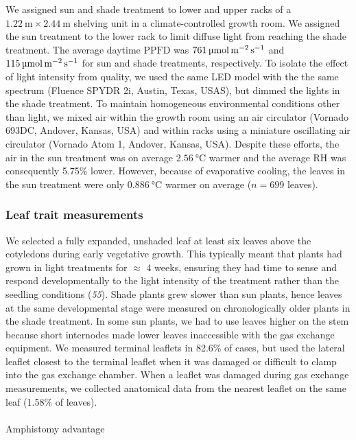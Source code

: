 \documentclass[
  letterpaper,
  DIV=11,
  numbers=noendperiod]{scrartcl}
\makeatletter
\let\oldparagraph\paragraph
\renewcommand{\paragraph}{
    \@ifstar
      \xxxParagraphStar
      \xxxParagraphNoStar
  }
\newcommand{\xxxParagraphStar}[1]{\oldparagraph*{#1}\mbox{}}
\newcommand{\xxxParagraphNoStar}[1]{\oldparagraph{#1}\mbox{}}
\newcommand{\ppfd}{$\mathrm{PPFD}$}
\newcommand{\ppfdqty}[1]{$\qty{#1}{\micro\mol\raiseto{-2}\meter\raiseto{-1}\second}$}
\makeatother
\begin{document}
We assigned sun and shade treatment to lower and upper racks of a
\(\qty{1.22}{\meter} \times \qty{2.44}{\meter}\) shelving unit in a
climate-controlled growth room. We assigned the sun treatment to the
lower rack to limit diffuse light from reaching the shade treatment. The
average daytime \ppfd{} was \ppfdqty{761} and \ppfdqty{115} for sun and
shade treatments, respectively. To isolate the effect of light intensity
from quality, we used the same LED model with the the same spectrum
(Fluence SPYDR 2i, Austin, Texas, USAS), but dimmed the lights in the
shade treatment. To maintain homogeneous environmental conditions other
than light, we mixed air within the growth room using an air circulator
(Vornado 693DC, Andover, Kansas, USA) and within racks using a miniature
oscillating air circulator (Vornado Atom 1, Andover, Kansas, USA).
Despite these efforts, the air in the sun treatment was on average
\(\qty{2.56}{\degreeCelsius}\) warmer and the average RH was
consequently 5.75\% lower. However, because of evaporative cooling, the
leaves in the sun treatment were only \(\qty{0.886}{\degreeCelsius}\)
warmer on average (\(n = 699\) leaves).

\subsubsection{Leaf trait measurements}\label{leaf-trait-measurements}

We selected a fully expanded, unshaded leaf at least six leaves above
the cotyledons during early vegetative growth. This typically meant that
plants had grown in light treatments for \(\approx\) 4 weeks, ensuring
they had time to sense and respond developmentally to the light
intensity of the treatment rather than the seedling conditions
(\emph{55}). Shade plants grew slower than sun plants, hence leaves at
the same developmental stage were measured on chronologically older
plants in the shade treatment. In some sun plants, we had to use leaves
higher on the stem because short internodes made lower leaves
inaccessible with the gas exchange equipment. We measured terminal
leaflets in 82.6\% of cases, but used the lateral leaflet closest to the
terminal leaflet when it was damaged or difficult to clamp into the gas
exchange chamber. When a leaflet was damaged during gas exchange
measurements, we collected anatomical data from the nearest leaflet on
the same leaf (1.58\% of leaves).

\paragraph{Amphistomy advantage}\label{amphistomy-advantage}
\end{document}
